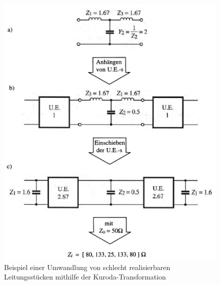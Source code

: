 \begin{figure}[h!]
    \centering
    \includegraphics[width=\imagewidth]{images/kuroda-schieben}
    \caption{Beispiel einer Umwandlung von schlecht realisierbaren Leitungsst\"ucken mithilfe der Kuroda-Transformation}
    \label{fig:kuroda-schieben}
\end{figure}

